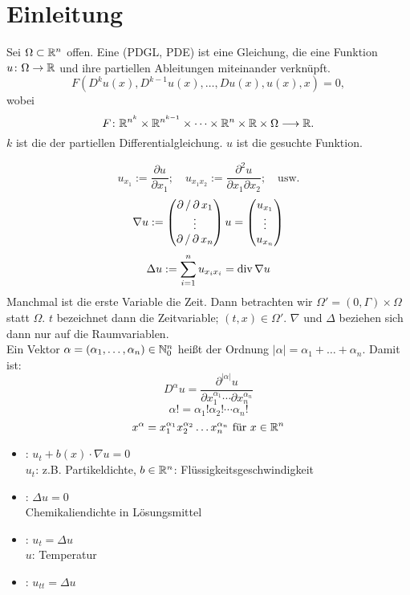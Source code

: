 \section{Einleitung}
\label{sec:para1}
\begin{defn}
	Sei $\Omega \subset \mathbb{R}^n$ offen.  Eine  (PDGL, PDE) ist eine Gleichung, die eine Funktion $u\colon \Omega \rightarrow \mathbb{R}$ und ihre partiellen Ableitungen miteinander verknüpft.
	\[ F(D^k u(x), D^{k-1} u(x), \dots, Du(x),u(x),x) = 0, \]
	wobei
	\[F\colon \mathbb{R}^{n^k} \times \mathbb{R}^{n^{k-1}} \times \dots \times \mathbb{R}^n \times \mathbb{R} \times \Omega \longrightarrow \mathbb{R}. \]
	$k$ ist die  der partiellen Differentialgleichung. $u$ ist die gesuchte Funktion.
\end{defn}
	
	\[ u_{x_1} := \frac{\partial u}{\partial x_1}; \quad u_{x_1 x_2} := \frac{\partial^2 u}{\partial x_1 \partial x_2}; \quad \text{usw.} \]
	\[ \nabla u := \begin{pmatrix} \operatorname{\partial} / \operatorname{\partial} x_1 \\ \vdots \\ \operatorname{\partial} / \operatorname{\partial} x_n \end{pmatrix} u = \begin{pmatrix} u_{x_1} \\ \vdots \\ u_{x_n} \end{pmatrix} \]
	\[ \Delta u := \sum\limits_{i=1}^{n} u_{x_i x_i} = \operatorname{div} \nabla u \]
	Manchmal ist die erste Variable die Zeit. Dann betrachten wir $\Omega' = (0,\Gamma) \times \Omega$ statt $\Omega$. $t$ bezeichnet dann die Zeitvariable; $(t,x) \in \Omega'$. $\nabla$ und $\Delta$ beziehen sich dann nur auf die Raumvariablen. \\
	Ein Vektor $\alpha = (\alpha_1,\dots,\alpha_n) \in \mathbb{N}_0^n$ heißt  der Ordnung $|\alpha| = \alpha_1+\dots+\alpha_n$. Damit ist:
	\[ D^\alpha u = \frac{\partial^{|\alpha|}u}{\partial x_1^{\alpha_1} \cdots \partial x_n^{\alpha_n}} \]
	\[ \alpha! = \alpha_1!\alpha_2!\cdots \alpha_n! \]
	\[ x^{\alpha} = x_1^{\alpha_1} x_2^{\alpha_2} \dots x_n^{\alpha_n} \text{ für } x \in \mathbb{R}^n \]
	
\begin{bsp}
	\begin{itemize}
		\item {}: $u_t + b(x) \cdot \nabla u = 0$ \\
		$u_t$: z.B. Partikeldichte, $b \in \mathbb{R}^n$: Flüssigkeitsgeschwindigkeit
		\item {}: $\Delta u = 0$ \\
		Chemikaliendichte in Lösungsmittel
		\item {}: $u_t = \Delta u$ \\
		$u$: Temperatur
		\item {}: $u_{tt} = \Delta u$
	\end{itemize}
\end{bsp}
	
